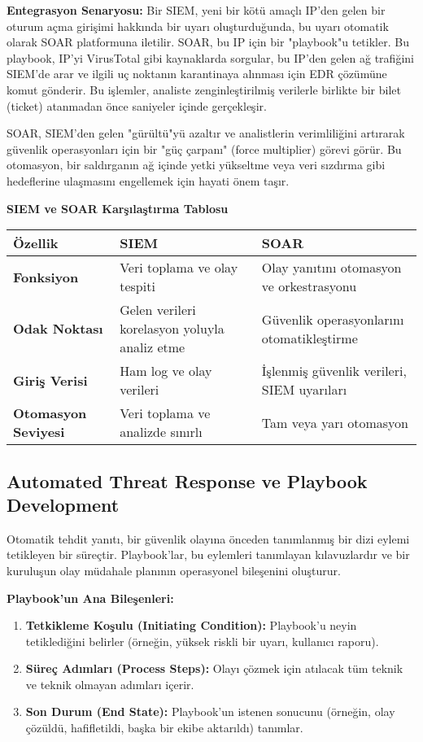 \textbf{Entegrasyon Senaryosu:}
Bir SIEM, yeni bir kötü amaçlı IP'den gelen bir oturum açma girişimi hakkında bir uyarı oluşturduğunda, bu uyarı otomatik olarak SOAR platformuna iletilir. SOAR, bu IP için bir "playbook"u tetikler. Bu playbook, IP'yi VirusTotal gibi kaynaklarda sorgular, bu IP'den gelen ağ trafiğini SIEM'de arar ve ilgili uç noktanın karantinaya alınması için EDR çözümüne komut gönderir. Bu işlemler, analiste zenginleştirilmiş verilerle birlikte bir bilet (ticket) atanmadan önce saniyeler içinde gerçekleşir.

SOAR, SIEM'den gelen "gürültü"yü azaltır ve analistlerin verimliliğini artırarak güvenlik operasyonları için bir "güç çarpanı" (force multiplier) görevi görür. Bu otomasyon, bir saldırganın ağ içinde yetki yükseltme veya veri sızdırma gibi hedeflerine ulaşmasını engellemek için hayati önem taşır.

\textbf{SIEM ve SOAR Karşılaştırma Tablosu}

\begin{tabularx}{\textwidth}{|l|X|X|}
\hline
\textbf{Özellik} & \textbf{SIEM} & \textbf{SOAR} \\
\hline
\textbf{Fonksiyon} & Veri toplama ve olay tespiti & Olay yanıtını otomasyon ve orkestrasyonu \\
\hline
\textbf{Odak Noktası} & Gelen verileri korelasyon yoluyla analiz etme & Güvenlik operasyonlarını otomatikleştirme \\
\hline
\textbf{Giriş Verisi} & Ham log ve olay verileri & İşlenmiş güvenlik verileri, SIEM uyarıları \\
\hline
\textbf{Otomasyon Seviyesi} & Veri toplama ve analizde sınırlı & Tam veya yarı otomasyon \\
\hline
\end{tabularx}

\subsection{Automated Threat Response ve Playbook Development}

Otomatik tehdit yanıtı, bir güvenlik olayına önceden tanımlanmış bir dizi eylemi tetikleyen bir süreçtir. Playbook'lar, bu eylemleri tanımlayan kılavuzlardır ve bir kuruluşun olay müdahale planının operasyonel bileşenini oluşturur.

\textbf{Playbook'un Ana Bileşenleri:}
\begin{enumerate}
    \item \textbf{Tetkikleme Koşulu (Initiating Condition):} Playbook'u neyin tetiklediğini belirler (örneğin, yüksek riskli bir uyarı, kullanıcı raporu).
    \item \textbf{Süreç Adımları (Process Steps):} Olayı çözmek için atılacak tüm teknik ve teknik olmayan adımları içerir.
    \item \textbf{Son Durum (End State):} Playbook'un istenen sonucunu (örneğin, olay çözüldü, hafifletildi, başka bir ekibe aktarıldı) tanımlar.
\end{enumerate}

